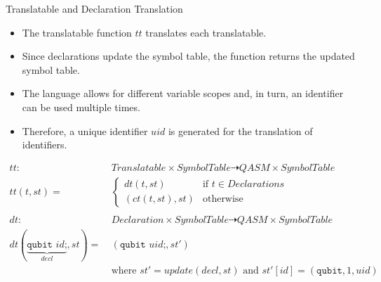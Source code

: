 \begin{frame}{Translatable and Declaration Translation}
    \begin{itemize}
        \item The translatable function $tt$ translates each translatable.
        \item Since declarations update the symbol table, the function returns the updated symbol table.
        \item The language allows for different variable scopes and, in turn, an identifier can be used multiple times.
        \item Therefore, a unique identifier $uid$ is generated for the translation of identifiers. 
    \end{itemize}
    \begin{align*}
        tt : \ & Translatable \times SymbolTable \dashrightarrow QASM \times SymbolTable\\
        tt(t, st) = \ & \begin{cases}
            dt(t, st)  \quad &\text{if } t \in Declarations\\
            (ct(t, st), st) &\text{otherwise }
        \end{cases}\\
        &\\
        dt : \ & Declaration \times SymbolTable \dashrightarrow QASM \times SymbolTable\\
        dt(\underbrace{\texttt{qubit } id \text{;}}_{decl}, st) = \ & (\texttt{qubit } uid\texttt{;}, st')\\
                                                                    & \text{where } st' = update(decl, st) \text{ and } st'[id] = (\texttt{qubit}, 1, uid)\\
    \end{align*}
\end{frame}

